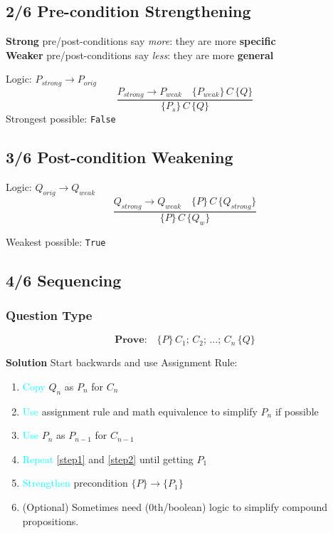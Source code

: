 \documentclass[10pt,landscape]{article}
\begin{document}
\begin{multicols*}{3}
\subsection*{2/6 Pre-condition Strengthening}
\textbf{Strong} pre/post-conditions say \emph{\textcolor{bl}{more}}: they are more \textbf{specific}\\
\textbf{Weaker} pre/post-conditions say \emph{\textcolor{bl}{less}}: they are more \textbf{general}


Logic: \(P_{strong} \rightarrow P_{orig} \)
\begin{displaymath}
  \frac{P_{strong} \rightarrow P_{weak} \quad \{P_{weak}\}\,C\,\{Q\} } {\{P_{s}\}\,C\,\{Q\}}
\end{displaymath}
\textcolor{bl}{Strongest} possible: \textcolor{gr}{\texttt{False}}

\subsection*{3/6 Post-condition Weakening}
Logic: \(Q_{orig} \rightarrow Q_{weak} \)
\begin{displaymath}
  \frac{Q_{strong}\rightarrow Q_{weak} \quad \{P\}\,C\,\{Q_{strong}\} } {\{P\}\,C\,\{Q_{w}\}}
\end{displaymath}

\textcolor{bl}{Weakest} possible: \textcolor{gr}{\texttt{True}}

\subsection*{4/6 Sequencing}
\subsubsection*{Question Type}
{
  \setlength{\abovedisplayskip}{0pt}
  \setlength{\belowdisplayskip}{3pt}
  \setlength{\abovedisplayshortskip}{0pt}
  \setlength{\belowdisplayshortskip}{3pt}

  \[\textbf{Prove:}\quad \{P\}\,C_{1};\,C_{2};\,\ldots ;\,C_{n}\,\{Q\}\]
}
\textbf{Solution} Start backwards and use Assignment Rule:
\begin{enumerate}
\item\label{step1} \textcolor{Cyan}{Copy} \(Q_{n}\) as \(P_{n}\) for \(C_{n}\)
\item\label{step2} \textcolor{Cyan}{Use} assignment rule and math equivalence to simplify \(P_{n}\) if possible
\item \textcolor{Cyan}{Use} \(P_{n}\) as \(P_{n-1}\) for \(C_{n-1}\)
\item \textcolor{Cyan}{Repeat} \ref{step1} and \ref{step2} until getting \(P_{1}\)
\item \textcolor{Cyan}{Strengthen} precondition \(\{P\}\rightarrow \{P_{1}\}\)
\item (Optional) Sometimes need (0th/boolean) logic to simplify compound propositions.


\end{enumerate}
\end{multicols*}
\end{document}
